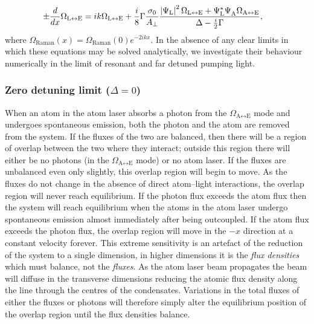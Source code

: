 \begin{subequations}
\begin{align}
        \pm \frac{d}{dx} \Omega_{\text{L}\leftrightarrow\text{E}} &= i k \Omega_{\text{L}\leftrightarrow\text{E}} + \frac{i}{8} \Gamma \frac{\sigma_0}{A_\perp} \frac{\abs{\Psi_\text{L}}^2 \Omega_{\text{L}\leftrightarrow\text{E}} + \Psi_\text{L}^* \Psi_\text{A}^{\phantom{*}} \Omega_{\text{A}\leftrightarrow\text{E}}}{\Delta - \frac{i}{2} \Gamma}, \label{OpticalPumping:TravellingBeamEvolution:OmegaL}
    \end{align}
\end{subequations}
where $\Omega_\text{Raman}(x) = \Omega_\text{Raman}(0) e^{- 2 i k x}$.  In the absence of any clear limits in which these equations may be solved analytically, we investigate their behaviour numerically in the limit of resonant and far detuned pumping light.

\subsubsection{Zero detuning limit ($\Delta = 0$)}

When an atom in the atom laser absorbs a photon from the $\Omega_{\text{A}\leftrightarrow\text{E}}$ mode and undergoes spontaneous emission, both the photon and the atom are removed from the system.  If the fluxes of the two are balanced, then there will be a region of overlap between the two where they interact; outside this region there will either be no photons (in the $\Omega_{\text{A}\leftrightarrow\text{E}}$ mode) or no  atom laser.  If the fluxes are unbalanced even only slightly, this overlap region will begin to move.  As the fluxes do not change in the absence of direct atom--light interactions, the overlap region will never reach equilibrium.  If the photon flux exceeds the atom flux then the system will reach equilibrium when the atoms in the atom laser undergo spontaneous emission almost immediately after being outcoupled.  If the atom flux exceeds the photon flux, the overlap region will move in the $-x$ direction at a constant velocity forever.  This extreme sensitivity is an artefact of the reduction of the system to a single dimension, in higher dimensions it is the \emph{flux densities} which must balance, not the \emph{fluxes}.  As the atom laser beam propagates the beam will diffuse in the transverse dimensions reducing the atomic flux density along the line through the centres of the condensates.  Variations in the total fluxes of either the fluxes or photons will therefore simply alter the equilibrium position of the overlap region until the flux densities balance.

